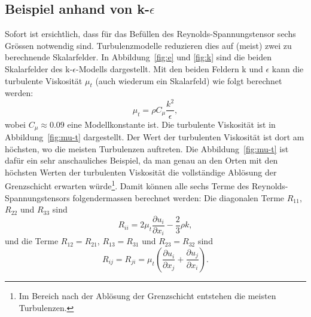 \subsection{Beispiel anhand von k-$\epsilon$}
%
Sofort ist ersichtlich, dass für das Befüllen des Reynolds-Spannungstensor sechs Grössen notwendig sind.
Turbulenzmodelle reduzieren dies auf (meist) zwei zu berechnende Skalarfelder.
%
%
%
%
In Abbildung~\ref{fig:e} und \ref{fig:k} sind die beiden Skalarfelder des k-$\epsilon$-Modells dargestellt.
Mit den beiden Feldern k und $\epsilon$ kann die turbulente Viskosität $\mu_t$ (auch wiederum ein Skalarfeld) wie
%
folgt berechnet werden:
%
\begin{equation}
    \label{eqs:Turbulent-Viscosity}
    \mu_t = \rho C_\mu \frac{k^2}{\epsilon},
\end{equation}
wobei $C_\mu \approx 0.09$ eine Modellkonstante ist.
%
Die turbulente Viskosität ist in Abbildung~\ref{fig:mu-t} dargestellt.
Der Wert der turbulenten Viskosität ist dort am höchsten, wo die meisten Turbulenzen auftreten.
Die Abbildung~\ref{fig:mu-t} ist dafür ein sehr anschauliches Beispiel,
da man genau an den Orten mit den höchsten Werten der turbulenten Viskosität die vollständige Ablösung
der Grenzschicht erwarten würde\footnote{Im Bereich nach der Ablösung der Grenzschicht entstehen die meisten Turbulenzen.}.
%
Damit können alle sechs Terme des Reynolds-Spannungstensors folgendermassen berechnet werden:
%
Die diagonalen Terme $R_{11}$, $R_{22}$ und $R_{33}$ sind
%
\begin{equation}
    R_{ii} = 2 \mu_t \frac{\partial u_i}{\partial x_i} - \frac{2}{3}\rho k,
\end{equation}
%
und die Terme $R_{12} = R_{21}$, $R_{13} = R_{31}$ und $R_{23} = R_{32}$ sind
%
\begin{equation}
    R_{ij} = R_{ji} = \mu_t \left( \frac{\partial u_i}{\partial x_j} + \frac{\partial u_j}{\partial x_i} \right).
\end{equation}
%
